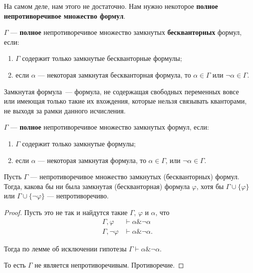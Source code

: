 На самом деле, нам этого не достаточно. Нам нужно некоторое \textbf{полное непротиворечивое множество формул}.
\begin{definition}
    $\Gamma$ --- \textbf{полное} непротиворечивое множество замкнутых \textbf{бескванторных} формул,
если:
\begin{enumerate}\item $\Gamma$ содержит только замкнутые бескванторные формулы;
\item если $\alpha$ --- некоторая замкнутая бескванторная формула, то $\alpha\in\Gamma$ или $\neg\alpha\in\Gamma$.
\end{enumerate}
\end{definition}
\begin{note}
    Замкнутая формула~--- формула, не содержащая свободных переменных вовсе или имеющая только такие их вхождения, которые нельзя связывать кванторами, не выходя за рамки данного исчисления.
\end{note}

\begin{definition}
    $\Gamma$ --- \textbf{полное} непротиворечивое множество замкнутых формул, если:
\begin{enumerate}\item $\Gamma$ содержит только замкнутые формулы;
\item если $\alpha$ --- некоторая замкнутая формула, то $\alpha \in \Gamma$, или $\neg\alpha \in \Gamma$.
\end{enumerate}
\end{definition}

\begin{theorem}
    Пусть $\Gamma$ --- непротиворечивое множество замкнутых (бескванторных) формул. Тогда, какова бы ни была
замкнутая (бескванторная) формула $\varphi$, хотя бы $\Gamma \cup \{\varphi\}$ или $\Gamma \cup \{\neg\varphi\}$ ---
непротиворечиво.
\end{theorem}
\begin{proof}
    Пусть это не так и найдутся такие $\Gamma$, $\varphi$ и $\alpha$, что
 \[ \begin{array}{rl}\Gamma,\varphi & \vdash \alpha\&\neg\alpha\\
\Gamma,\neg\varphi & \vdash \alpha \&\neg\alpha. \end{array}\]

Тогда по лемме об исключении гипотезы $ \Gamma\vdash \alpha\&\neg\alpha. $

То есть $\Gamma$ не является непротиворечивым. Противоречие.
\end{proof}

